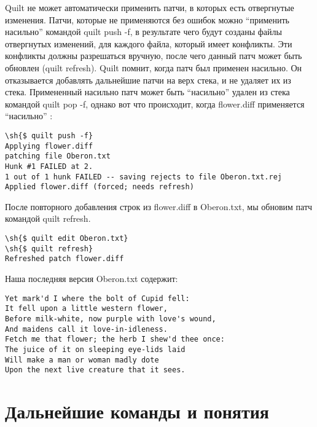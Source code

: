 \documentclass{article}
\newcommand{\quilt}[1]{\textsf{quilt #1}}
\renewcommand{\sh}[1]{\textsl{#1}}
\begin{document}
Quilt не может автоматически применить патчи, в которых есть отвергнутые изменения. Патчи, которые не применяются без ошибок можно ``применить насильно'' командой \quilt{push -f}, в результате чего будут созданы файлы отвергнутых изменений, для каждого файла, который имеет конфликты. Эти конфликты должны разрешаться вручную, после чего данный патч может быть обновлен (\quilt{refresh}). Quilt помнит, когда патч был применен насильно. Он отказывается добавлять дальнейшие патчи на верх стека, и не удаляет их из стека. Примененный насильно патч может быть ``насильно'' удален из стека командой \quilt{pop -f}, однако вот что происходит, когда \textsf{flower.diff} применяется ``насильно'' :

\begin{small}
\begin{Verbatim}
\sh{$ quilt push -f}
Applying flower.diff
patching file Oberon.txt
Hunk #1 FAILED at 2.
1 out of 1 hunk FAILED -- saving rejects to file Oberon.txt.rej
Applied flower.diff (forced; needs refresh)
\end{Verbatim}
\end{small}

После повторного добавления строк из \textsf{flower.diff} в \textsf{Oberon.txt}, мы обновим патч командой \quilt{refresh}.

\begin{small}
\begin{Verbatim}
\sh{$ quilt edit Oberon.txt}
\sh{$ quilt refresh}
Refreshed patch flower.diff
\end{Verbatim}
\end{small}

Наша последняя версия \textsf{Oberon.txt} содержит:

\begin{small}
\begin{Verbatim}
Yet mark'd I where the bolt of Cupid fell:
It fell upon a little western flower,
Before milk-white, now purple with love's wound,
And maidens call it love-in-idleness.
Fetch me that flower; the herb I shew'd thee once:
The juice of it on sleeping eye-lids laid
Will make a man or woman madly dote
Upon the next live creature that it sees.
\end{Verbatim}
\end{small}

\section{Дальнейшие команды и понятия}
\end{document}
